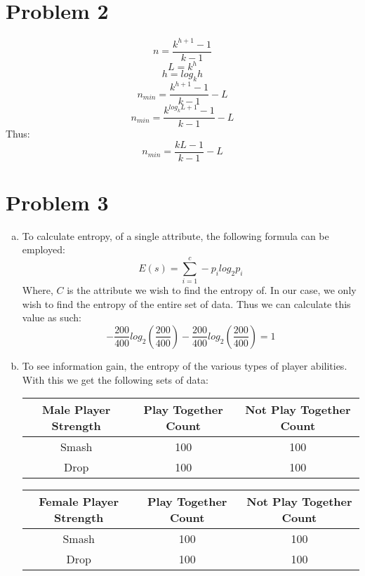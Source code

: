 \documentclass[12pt]{article}%
\begin{document}
\section*{Problem 2}
    \[n = \frac{k^{h+1} -1}{k -1}\]
    \[L = k^h\]
    \[h = log_kh\]
    \[n_{min} = \frac{k^{h+1} -1}{k -1} - L\]
    \[n_{min} = \frac{k^{log_k L+1} -1}{k -1} - L\]
    Thus:
    \[n_{min} = \frac{kL -1}{k -1} - L\]
\section*{Problem 3}
    \begin{enumerate}[a.]
        \item 
        To calculate entropy, of a single attribute, the following formula can be employed:
            \[E(s) = \sum\limits_{i=1}^{c} -p_ilog_2p_i\]
        Where, $C$ is the attribute we wish to find the entropy of.
        In our case, we only wish to find the entropy of the entire set of data. Thus we can calculate this value as such: 
            \[-\frac{200}{400}log_2(\frac{200}{400}) - \frac{200}{400}log_2(\frac{200}{400}) = 1\]
        \item
        To see information gain, the entropy of the various types of player abilities. With this we get the following sets of data:
        \begin{center}
            \begin{tabular}{c|c|c}
                Male Player Strength & Play Together Count & Not Play Together Count\\ \hline \hline
                Smash & 100 & 100\\ \hline
                Drop & 100 & 100\\ \hline
            \end{tabular}
        
            \begin{tabular}{c|c|c}
                Female Player Strength & Play Together Count & Not Play Together Count\\ \hline \hline
                Smash & 100 & 100\\ \hline
                Drop & 100 & 100\\ \hline
            \end{tabular}
        

\end{center}
\end{enumerate}
\end{document}
